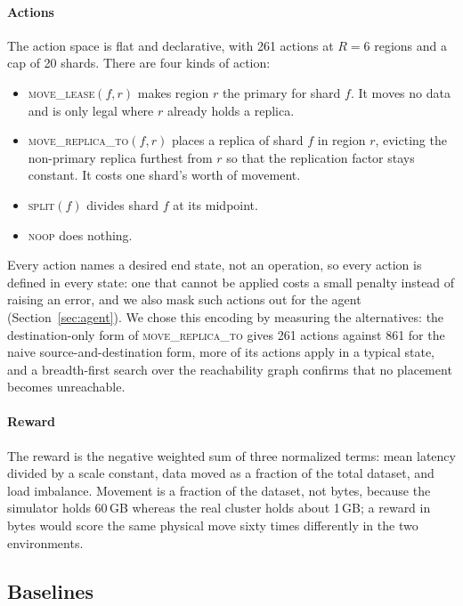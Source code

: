 \paragraph{Actions} The action space is flat and declarative, with 261 actions
at $R=6$ regions and a cap of 20 shards. There are four kinds of action:

\begin{itemize}
\item \textsc{move\_lease}$(f, r)$ makes region $r$ the primary for shard $f$.
It moves no data and is only legal where $r$ already holds a replica.
\item \textsc{move\_replica\_to}$(f, r)$ places a replica of shard $f$ in
region $r$, evicting the non-primary replica furthest from $r$ so that the
replication factor stays constant. It costs one shard's worth of movement.
\item \textsc{split}$(f)$ divides shard $f$ at its midpoint.
\item \textsc{noop} does nothing.
\end{itemize}

Every action names a desired end state, not an operation, so every action is
defined in every state: one that cannot be applied costs a small penalty instead
of raising an error, and we also mask such actions out for the agent
(Section~\ref{sec:agent}). We chose this encoding by measuring the
alternatives: the destination-only form of \textsc{move\_replica\_to} gives 261
actions against 861 for the naive source-and-destination form, more of its
actions apply in a typical state, and a breadth-first search over the
reachability graph confirms that no placement becomes unreachable.

\paragraph{Reward} The reward is the negative weighted sum of three normalized
terms: mean latency divided by a scale constant, data moved as a fraction of
the total dataset, and load imbalance. Movement is a fraction of the dataset,
not bytes, because the simulator holds 60\,GB whereas the real cluster holds
about 1\,GB; a reward in bytes would score the same physical move sixty times
differently in the two environments.

\subsection{Baselines}

